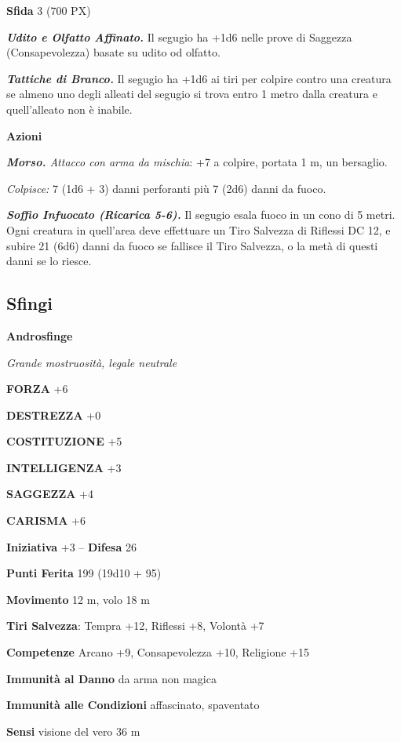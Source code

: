 \begin{multicols}{2}
\textbf{Sfida} 3 (700 PX)

\textit{\textbf{Udito e Olfatto Affinato.}} Il segugio ha +1d6 nelle prove di Saggezza (Consapevolezza) basate su udito od olfatto.

\textit{\textbf{Tattiche di Branco.}} Il segugio ha +1d6 ai tiri per colpire contro una creatura se almeno uno degli alleati del segugio si trova entro 1 metro dalla creatura e quell'alleato non è inabile.

\textbf{Azioni}

\textit{\textbf{Morso.} Attacco con arma da mischia}: +7 a colpire, portata 1 m, un bersaglio.

\textit{Colpisce:} 7 (1d6 + 3) danni perforanti più 7 (2d6) danni da fuoco.

\textit{\textbf{Soffio Infuocato (Ricarica 5-6).}} Il segugio esala fuoco in un cono di 5 metri. Ogni creatura in quell'area deve effettuare un Tiro Salvezza di Riflessi DC 12, e subire 21 (6d6) danni da fuoco se fallisce il Tiro Salvezza, o la metà di questi danni se lo riesce.



\subsection{Sfingi}

\medskip{}\textbf{Androsfinge}

\textit{Grande mostruosità, legale neutrale}

\textbf{FORZA} +6

\textbf{DESTREZZA} +0

\textbf{COSTITUZIONE} +5

\textbf{INTELLIGENZA} +3

\textbf{SAGGEZZA} +4

\textbf{CARISMA} +6

\textbf{Iniziativa} +3 -- \textbf{Difesa} 26

\textbf{Punti Ferita} 199 (19d10 + 95)

\textbf{Movimento} 12 m, volo 18 m

\textbf{Tiri Salvezza}: Tempra +12, Riflessi +8, Volontà +7

\textbf{Competenze} Arcano +9, Consapevolezza +10, Religione +15

\textbf{Immunità al Danno} da arma non magica

\textbf{Immunità alle Condizioni} affascinato, spaventato

\textbf{Sensi} visione del vero 36 m


\end{multicols}
